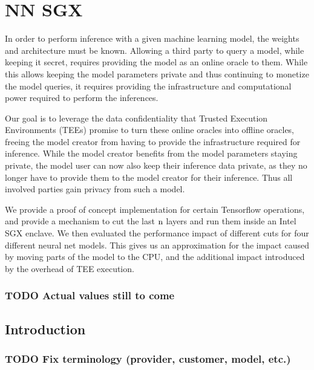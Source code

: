 \documentclass[11pt]{article}
\date{\today}
\title{}
\begin{document}
\tableofcontents

\section{NN SGX}
\label{sec:orgeaeff13}
In order to perform inference with a given machine learning model, the weights and architecture must be known.
Allowing a third party to query a model, while keeping it secret, requires providing the model as an online oracle to them.
While this allows keeping the model parameters private and thus continuing to monetize the model queries, it requires providing the infrastructure and computational power required to perform the inferences.

Our goal is to leverage the data confidentiality that Trusted Execution Environments (TEEs) promise to turn these online oracles into offline oracles, freeing the model creator from having to provide the infrastructure required for inference.
While the model creator benefits from the model parameters staying private, the model user can now also keep their inference data private, as they no longer have to provide them to the model creator for their inference.
Thus all involved parties gain privacy from such a model.

We provide a proof of concept implementation for certain Tensorflow operations, and provide a mechanism to cut the last \($n$\) layers and run them inside an Intel SGX enclave.
We then evaluated the performance impact of different cuts for four different neural net models.
This gives us an approximation for the impact caused by moving parts of the model to the CPU, and the additional impact introduced by the overhead of TEE execution.

\subsubsection{{\bfseries\sffamily TODO} Actual values still to come}
\label{sec:orga449875}

\subsection{Introduction}
\label{sec:orgb5ec4c8}

\subsubsection{{\bfseries\sffamily TODO} Fix terminology (provider, customer, model, etc.)}
\label{sec:orgc3f8be6}
\end{document}
